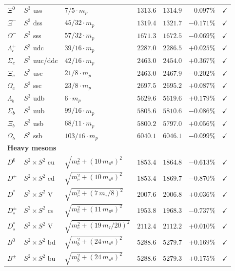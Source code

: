 \documentclass[11pt]{article}
\begin{document}
{\begin{longtable}{@{}p{1.2cm}p{2.4cm}p{4.8cm}p{1.6cm}p{1.4cm}rc@{}}
$\Xi^0$ & $S^3$ uss & $7/5\cdot m_p$ & $1313.6$ & $1314.9$ & $-0.097\%$ & $\checkmark$ \\
$\Xi^-$ & $S^3$ dss & $45/32\cdot m_p$ & $1319.4$ & $1321.7$ & $-0.171\%$ & $\checkmark$ \\
$\Omega^-$ & $S^3$ sss & $57/32\cdot m_p$ & $1671.3$ & $1672.5$ & $-0.069\%$ & $\checkmark$ \\
$\Lambda_c^+$ & $S^3$ udc & $39/16\cdot m_p$ & $2287.0$ & $2286.5$ & $+0.025\%$ & $\checkmark$ \\
$\Sigma_c$ & $S^3$ uuc/ddc & $42/16\cdot m_p$ & $2463.0$ & $2454.0$ & $+0.367\%$ & $\checkmark$ \\
$\Xi_c$ & $S^3$ usc & $21/8\cdot m_p$ & $2463.0$ & $2467.9$ & $-0.202\%$ & $\checkmark$ \\
$\Omega_c$ & $S^3$ ssc & $23/8\cdot m_p$ & $2697.5$ & $2695.2$ & $+0.087\%$ & $\checkmark$ \\
$\Lambda_b$ & $S^3$ udb & $6\cdot m_p$ & $5629.6$ & $5619.6$ & $+0.179\%$ & $\checkmark$ \\
$\Sigma_b$ & $S^3$ uub & $99/16\cdot m_p$ & $5805.6$ & $5810.6$ & $-0.086\%$ & $\checkmark$ \\
$\Xi_b$ & $S^3$ usb & $68/11\cdot m_p$ & $5800.2$ & $5797.0$ & $+0.056\%$ & $\checkmark$ \\
$\Omega_b$ & $S^3$ ssb & $103/16\cdot m_p$ & $6040.1$ & $6046.1$ & $-0.099\%$ & $\checkmark$ \\
\multicolumn{7}{l}{\textbf{Heavy mesons}} \\
$D^0$ & $S^2\times S^2$ cu & $\sqrt{m_c^2+(10\,m_{\pi^0})^2}$ & $1853.4$ & $1864.8$ & $-0.613\%$ & $\checkmark$ \\
$D^\pm$ & $S^2\times S^2$ cd & $\sqrt{m_c^2+(10\,m_{\pi^0})^2}$ & $1853.4$ & $1869.7$ & $-0.870\%$ & $\checkmark$ \\
$D^*$ & $S^2\times S^2$ V & $\sqrt{m_c^2+(7\,m_\tau/8)^2}$ & $2007.6$ & $2006.8$ & $+0.036\%$ & $\checkmark$ \\
$D_s^\pm$ & $S^2\times S^2$ cs & $\sqrt{m_c^2+(11\,m_{\pi^0})^2}$ & $1953.8$ & $1968.3$ & $-0.737\%$ & $\checkmark$ \\
$D_s^*$ & $S^2\times S^2$ V & $\sqrt{m_c^2+(19\,m_\tau/20)^2}$ & $2112.4$ & $2112.2$ & $+0.010\%$ & $\checkmark$ \\
$B^0$ & $S^2\times S^2$ bd & $\sqrt{m_b^2+(24\,m_{\pi^0})^2}$ & $5288.6$ & $5279.7$ & $+0.169\%$ & $\checkmark$ \\
$B^\pm$ & $S^2\times S^2$ bu & $\sqrt{m_b^2+(24\,m_{\pi^0})^2}$ & $5288.6$ & $5279.3$ & $+0.175\%$ & $\checkmark$ \\

\end{longtable}}
\end{document}
